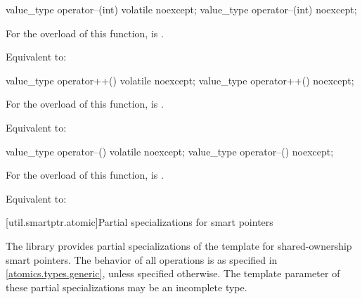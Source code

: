 %
%
\begin{itemdecl}
value_type operator--(int) volatile noexcept;
value_type operator--(int) noexcept;
\end{itemdecl}

\begin{itemdescr}
\pnum
\constraints
For the  overload of this function,
 is .

\pnum
\effects
Equivalent to: 
\end{itemdescr}

%
%
\begin{itemdecl}
value_type operator++() volatile noexcept;
value_type operator++() noexcept;
\end{itemdecl}

\begin{itemdescr}
\pnum
\constraints
For the  overload of this function,
 is .

\pnum
\effects
Equivalent to: 
\end{itemdescr}

%
%
\begin{itemdecl}
value_type operator--() volatile noexcept;
value_type operator--() noexcept;
\end{itemdecl}

\begin{itemdescr}
\pnum
\constraints
For the  overload of this function,
 is .

\pnum
\effects
Equivalent to: 
\end{itemdescr}

%
[util.smartptr.atomic]{Partial specializations for smart pointers}

\pnum
The library provides partial specializations of the  template
for shared-ownership smart pointers.
The behavior of all operations is as specified in \ref{atomics.types.generic},
unless specified otherwise.
The template parameter  of these partial specializations
may be an incomplete type.

